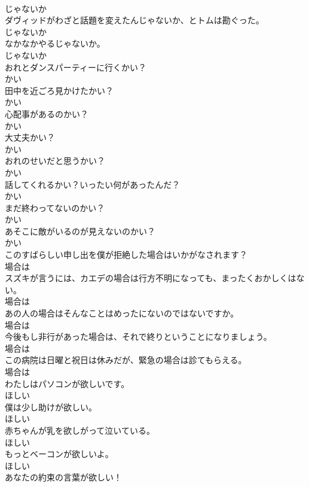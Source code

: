 \documentclass[8pt]{extreport}
\begin{document}
\begin{CJK}{UTF8}{min}
\\	じゃないか
\\	ダヴィッドがわざと話題を変えたんじゃないか、とトムは勘ぐった。	
\\	じゃないか
\\	なかなかやるじゃないか。	
\\	じゃないか
\\	おれとダンスパーティーに行くかい？	
\\	かい
\\	田中を近ごろ見かけたかい？	
\\	かい
\\	心配事があるのかい？	
\\	かい
\\	大丈夫かい？	
\\	かい
\\	おれのせいだと思うかい？	
\\	かい
\\	話してくれるかい？いったい何があったんだ？	
\\	かい
\\	まだ終わってないのかい？	
\\	かい
\\	あそこに敵がいるのが見えないのかい？	
\\	かい
\\	このすばらしい申し出を僕が拒絶した場合はいかがなされます？	
\\	場合は
\\	スズキが言うには、カエデの場合は行方不明になっても、まったくおかしくはない。	
\\	場合は
\\	あの人の場合はそんなことはめったにないのではないですか。	
\\	場合は
\\	今後もし非行があった場合は、それで終りということになりましょう。	
\\	場合は
\\	この病院は日曜と祝日は休みだが、緊急の場合は診てもらえる。	
\\	場合は
\\	わたしはパソコンが欲しいです。	
\\	ほしい
\\	僕は少し助けが欲しい。	
\\	ほしい
\\	赤ちゃんが乳を欲しがって泣いている。	
\\	ほしい
\\	もっとベーコンが欲しいよ。	
\\	ほしい
\\	あなたの約束の言葉が欲しい！	

\end{CJK}
\end{document}
